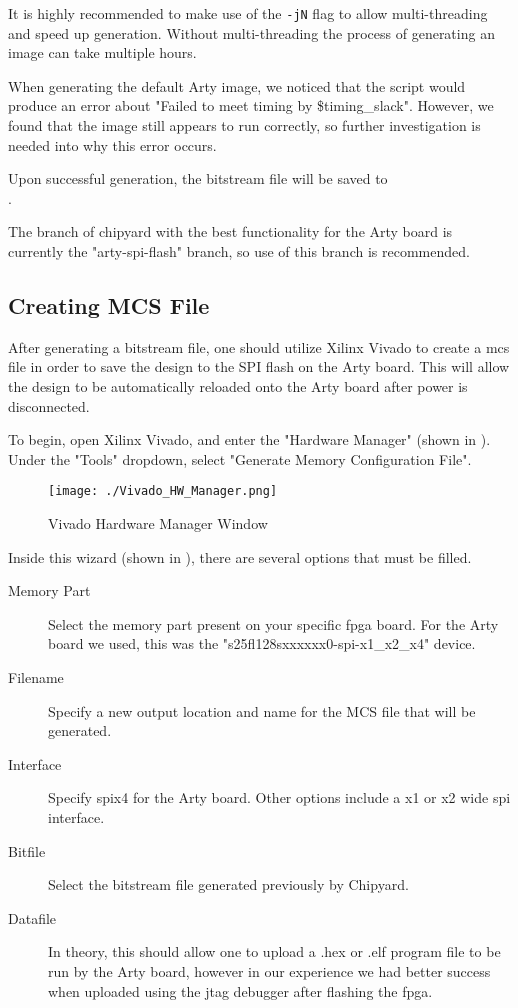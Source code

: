 It is highly recommended to make use of the \texttt{-jN} flag to allow multi-threading and speed up generation.
Without multi-threading the process of generating an image can take multiple hours.

When generating the default Arty image, we noticed that the script would produce an error about "Failed to meet timing by \$timing\_slack".
However, we found that the image still appears to run correctly, so further investigation is needed into why this error occurs.

Upon successful generation, the bitstream file will be saved to \\ .

The branch of chipyard with the best functionality for the Arty board is currently the "arty-spi-flash" branch, so use of this branch is recommended.

\subsection{Creating MCS File}\label{sec:Creating_MCS_file}
After generating a bitstream file, one should utilize Xilinx Vivado to create a \gls{mcs} file in order to save the design to the SPI flash on the Arty board.
This will allow the design to be automatically reloaded onto the Arty board after power is disconnected.

To begin, open Xilinx Vivado, and enter the "Hardware Manager" (shown in ).
Under the "Tools" dropdown, select "Generate Memory Configuration File".
\begin{figure}[h!tbp]
  \centering
  \texttt{[image: ./Vivado\_HW\_Manager.png]}
  \caption{Vivado Hardware Manager Window}
  \label{fig:Vivado_HW_Manager}
\end{figure}

Inside this wizard (shown in ), there are several options that must be filled.
\begin{description}
\item[Memory Part] Select the memory part present on your specific \Gls{fpga} board.
  For the Arty board we used, this was the "s25fl128sxxxxxx0-spi-x1\_x2\_x4" device.
\item[Filename] Specify a new output location and name for the MCS file that will be generated.
\item[Interface] Specify \Gls{spi}x4 for the Arty board. Other options include a x1 or x2 wide \Gls{spi} interface.
\item[Bitfile] Select the bitstream file generated previously by Chipyard.
\item[Datafile] In theory, this should allow one to upload a .hex or .elf program file to be run by the Arty board, however in our experience we had better success when uploaded using the \Gls{jtag} debugger after flashing the \Gls{fpga}.
\end{description}

